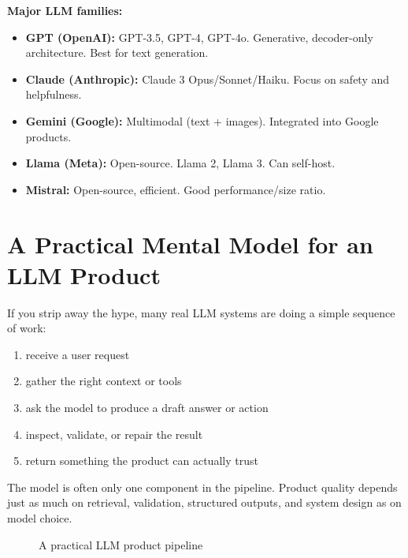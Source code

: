 \documentclass[12pt, a4paper, oneside]{book}
\begin{document}
\textbf{Major LLM families:}
\begin{itemize}[leftmargin=2em]
    \item \textbf{GPT (OpenAI):} GPT-3.5, GPT-4, GPT-4o. Generative, decoder-only architecture. Best for text generation.
    \item \textbf{Claude (Anthropic):} Claude 3 Opus/Sonnet/Haiku. Focus on safety and helpfulness.
    \item \textbf{Gemini (Google):} Multimodal (text + images). Integrated into Google products.
    \item \textbf{Llama (Meta):} Open-source. Llama 2, Llama 3. Can self-host.
    \item \textbf{Mistral:} Open-source, efficient. Good performance/size ratio.
\end{itemize}

\section{A Practical Mental Model for an LLM Product}

If you strip away the hype, many real LLM systems are doing a simple sequence of work:
\begin{enumerate}[leftmargin=2em]
    \item receive a user request
    \item gather the right context or tools
    \item ask the model to produce a draft answer or action
    \item inspect, validate, or repair the result
    \item return something the product can actually trust
\end{enumerate}

\begin{intuitionbox}
The model is often only one component in the pipeline. Product quality depends just as much on retrieval, validation, structured outputs, and system design as on model choice.
\end{intuitionbox}

\begin{figure}[H]
\centering
{}
\caption{A practical LLM product pipeline}
\label{fig:llm-product-pipeline}
\end{figure}
\end{document}
